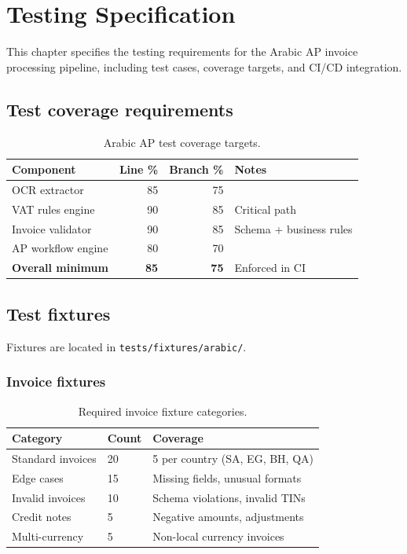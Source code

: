 \chapter{Testing Specification}\label{ch:testing}

This chapter specifies the testing requirements for the Arabic AP invoice
processing pipeline, including test cases, coverage targets, and CI/CD
integration.

\section{Test coverage requirements}

\begin{table}[htbp]
\centering
\caption{Arabic AP test coverage targets.}
\label{tab:arabic-coverage}
\footnotesize
\begin{tabularx}{\linewidth}{@{}l r r X@{}}
\toprule
\textbf{Component} & \textbf{Line \%} & \textbf{Branch \%} & \textbf{Notes} \\ \midrule
OCR extractor & 85 & 75 & \\
VAT rules engine & 90 & 85 & Critical path \\
Invoice validator & 90 & 85 & Schema + business rules \\
AP workflow engine & 80 & 70 & \\
\textbf{Overall minimum} & \textbf{85} & \textbf{75} & Enforced in CI \\
\bottomrule
\end{tabularx}
\end{table}

\section{Test fixtures}

Fixtures are located in \texttt{tests/fixtures/arabic/}.

\subsection{Invoice fixtures}

\begin{table}[htbp]
\centering
\caption{Required invoice fixture categories.}
\footnotesize
\begin{tabularx}{\linewidth}{@{}l l X@{}}
\toprule
\textbf{Category} & \textbf{Count} & \textbf{Coverage} \\ \midrule
Standard invoices & 20 & 5 per country (SA, EG, BH, QA) \\
Edge cases & 15 & Missing fields, unusual formats \\
Invalid invoices & 10 & Schema violations, invalid TINs \\
Credit notes & 5 & Negative amounts, adjustments \\
Multi-currency & 5 & Non-local currency invoices \\
\bottomrule
\end{tabularx}
\end{table}


